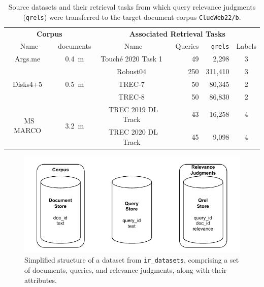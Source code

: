 \begin{table}[t]
    \centering
    \footnotesize
    \caption{Source datasets and their retrieval tasks from which query relevance judgments (\texttt{qrels}) were transferred to the target document corpus \texttt{ClueWeb22/b}.}
    \label{tab:datasets}
    \begin{tabular}{cccrrc}
        \toprule
        \multicolumn{2}{c}{\textbf{Corpus}} & \multicolumn{4}{c}{\textbf{ Associated Retrieval Tasks}} \\
        \cmidrule(lr){1-2} \cmidrule(lr){3-6}
        Name & documents  & Name & Queries &\texttt{qrels} & Labels \\
        \toprule
        
        Args.me~\cite{ajjour:2019} & 0.4~m & Touché 2020 Task 1~\cite{bondarenko:2020} & 49 & 2,298 & 3 \\
        \midrule

        \multirow{3}{*}{Disks4+5~\cite{voorhees:1996}} & \multirow{3}{*}{0.5~m} & Robust04~\cite{voorhees:2004} & 250 & 311,410 & 3 \\
        & & TREC-7~\cite{voorhees:1998} & 50 & 80,345 & 2 \\
        & & TREC-8~\cite{voorhees:1999} & 50 & 86,830 & 2 \\
        \midrule

        \multirow{2}{*}{MS MARCO~\cite{bajaj:2016}} & \multirow{2}{*}{3.2~m} & TREC 2019 DL Track~\cite{craswell:2019} & 43 & 16,258 & 4 \\
        & & TREC 2020 DL Track~\cite{craswell:2020} & 45 & 9,098 & 4 \\
        
        \bottomrule
    \end{tabular}
\end{table}

\begin{figure}[t]
    \centering
    \includegraphics[width=\textwidth]{./graphics/drawio/datasets.pdf}
    \caption{Simplified structure of a dataset from \texttt{ir\_datasets}, comprising a set of documents, queries, and relevance judgments, along with their attributes.}
    \label{fig:datasets}
\end{figure}

